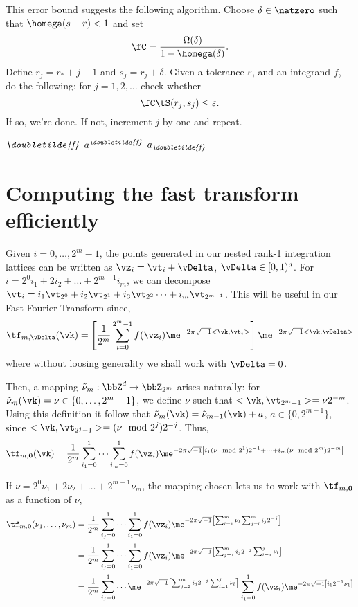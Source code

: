 \documentclass[]{elsarticle}
\newcommand{\fudge}{\fC}
\newcommand{\dtf}{\textit{\doubletilde{f}}}
\theoremstyle{definition}
\theoremstyle{remark}
\begin{document}
This error bound suggests the following algorithm.  Choose $\delta \in \natzero$ such that $\homega(s-r)<1$ and set
\[
\fudge = \frac{\Omega(\delta)}{1 - \homega(\delta)}.
\]
Define $r_j=r_*+j-1$ and $s_j=r_j+\delta$.  Given a tolerance $\varepsilon$, and an integrand $f$, do the following:  for $j=1, 2, \ldots$ check whether
\[
\fudge \tS(r_j,s_j) \le \varepsilon.
\]
If so, we're done.  If not, increment $j$ by one and repeat.


$\dtf$ $a^{\dtf}$ $a_{\dtf}$

\section{Computing the fast transform efficiently}

Given $i=0,\dots,2^m-1$, the points generated in our nested rank-1 integration lattices can be written as $\vz_i=\vt_i+\vDelta$, $\vDelta\in[0,1)^d$. For $i=2^0i_1+2i_2+\dots+2^{m-1}i_m$, we can decompose $\vt_i=i_1\vt_{2^0}+i_2\vt_{2^1}+i_3\vt_{2^{2}}\dots+i_m\vt_{2^{m-1}}$. This will be useful in our Fast Fourier Transform since,
\begin{equation*}
\tf_{m,\vDelta}(\vk) = \left[\frac{1}{2^m} \sum_{i=0}^{2^m-1} f(\vz_i)\me^{-2 \pi \sqrt{-1} <\vk , \vt_i>} \right]\me^{-2 \pi \sqrt{-1} <\vk , \vDelta>}
\end{equation*}
where without loosing generality we shall work with $\vDelta=0$.

Then, a mapping $\tilde{\nu}_m:\bbZ^d\rightarrow\bbZ_{2^m}$ arises naturally: for $\tilde{\nu}_m(\vk)=\nu\in\{0,\dots,2^m-1\}$, we define $\nu$ such that $<\vk , \vt_{2^m-1}>=\nu2^{-m}$. Using this definition it follow that $\tilde{\nu}_m(\vk)=\tilde{\nu}_{m-1}(\vk)+a$, $a\in\{0,2^{m-1}\}$, since $<\vk , \vt_{2^j-1}>=(\nu\mod2^j)2^{-j}$. Thus,
\begin{align*}
\tf_{m,\bvec{0}}(\vk) &= \frac{1}{2^m} \sum_{i_1=0}^{1}\cdots\sum_{i_m=0}^{1} f(\vz_i)\me^{-2 \pi \sqrt{-1} \left[i_1(\nu\mod2^1)2^{-1}+\cdots+i_m(\nu\mod2^{m})2^{-m}\right]}
\end{align*}

If $\nu=2^0\nu_1+2\nu_2+\dots+2^{m-1}\nu_m$, the mapping chosen lets us to work with $\tf_{m,\bvec{0}}$ as a function of $\nu$,
\begin{align*}
\tf_{m,\bvec{0}}(\nu_1,\dots,\nu_m) &= \frac{1}{2^m} \sum_{i_j=0}^{1}\cdots\sum_{i_1=0}^{1} f(\vz_i)\me^{-2 \pi \sqrt{-1} \left[\sum_{l=1}^m\nu_l\sum_{j=l}^m i_j2^{-j}\right]}\\
    &= \frac{1}{2^m} \sum_{i_j=0}^{1}\cdots\sum_{i_1=0}^{1} f(\vz_i)\me^{-2 \pi \sqrt{-1} \left[\sum_{j=1}^m i_j2^{-j}\sum_{l=1}^j \nu_l \right]}\\
    &=\frac{1}{2^m} \sum_{i_j=0}^{1}\cdots\me^{-2 \pi \sqrt{-1} \left[\sum_{j=2}^m i_j2^{-j}\sum_{l=1}^j \nu_l \right]}\sum_{i_1=0}^{1} f(\vz_i)\me^{-2 \pi \sqrt{-1} \left[i_12^{-1}\nu_1 \right]}\\
\end{align*}



\end{document}
